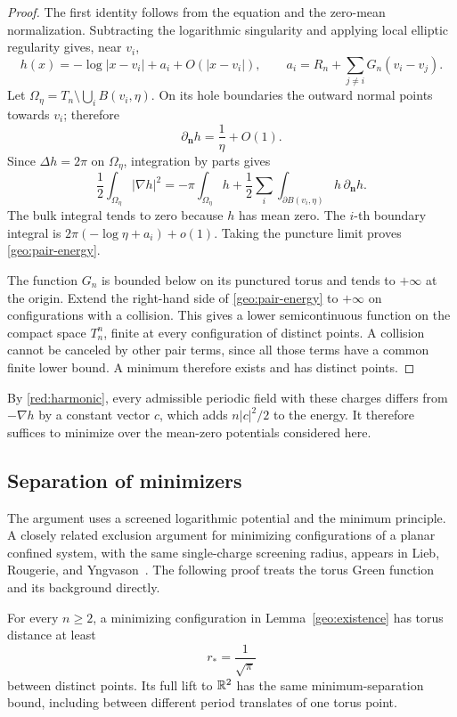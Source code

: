 \begin{proof}
The first identity follows from the equation and the zero-mean
normalization.  Subtracting the logarithmic singularity and applying
local elliptic regularity gives, near \(v_i\),
\[
 h(x)=-\log|x-v_i|+a_i+O(|x-v_i|),\qquad
 a_i=R_n+\sum_{j\ne i}G_n(v_i-v_j).
\]
Let \(\Omega_\eta=T_n\setminus\bigcup_iB(v_i,\eta)\).
On its hole boundaries the outward normal points towards \(v_i\);
therefore
\[
 \partial_{\boldsymbol n}h=\frac1\eta+O(1).
\]
Since \(\Delta h=2\pi\) on \(\Omega_\eta\), integration by parts gives
\[
 \frac12\int_{\Omega_\eta}|\nabla h|^2
 =-\pi\int_{\Omega_\eta}h
   +\frac12\sum_i\int_{\partial B(v_i,\eta)}
                         h\,\partial_{\boldsymbol n}h.
\]
The bulk integral tends to zero because \(h\) has mean zero.  The
\(i\)-th boundary integral is
\(2\pi(-\log\eta+a_i)+o(1)\).  Taking the puncture limit proves
\eqref{geo:pair-energy}.

The function \(G_n\) is bounded below on its punctured torus and tends
to \(+\infty\) at the origin.  Extend the right-hand side of
\eqref{geo:pair-energy} to \(+\infty\) on configurations with a
collision.  This gives a lower semicontinuous function on the compact
space \(T_n^n\), finite at every configuration of distinct points.
A collision cannot be canceled by other pair terms, since all those
terms have a common finite lower bound.  A minimum therefore exists
and has distinct points.
\end{proof}

By \eqref{red:harmonic}, every admissible periodic field with these
charges differs from \(-\nabla h\) by a constant vector \(c\), which
adds \(n|c|^2/2\) to the energy.  It therefore suffices to minimize
over the mean-zero potentials considered here.

\subsection{Separation of minimizers}

The argument uses a screened logarithmic potential and the minimum
principle. A closely related exclusion argument for minimizing
configurations of a planar confined system, with the same single-charge
screening radius, appears in Lieb, Rougerie, and
Yngvason~\cite[Lemma~3 and Appendix~A]{LiebRougerieYngvason2018}.
The following proof treats the torus Green function and its background
directly.

\begin{lemma}[Separation]
\label{geo:separation}
For every \(n\geq2\), a minimizing configuration in
Lemma~\ref{geo:existence} has torus distance at least
\[
 r_*=\frac1{\sqrt\pi}
\]
between distinct points.  Its full lift to \(\mathbb R^2\) has the same
minimum-separation bound, including between different period
translates of one torus point.
\end{lemma}

